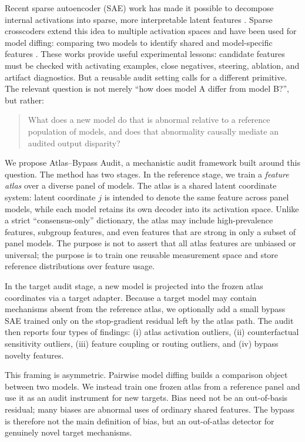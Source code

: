 \documentclass[11pt]{article}
\newcommand{\method}{Atlas--Bypass Audit\xspace}
\begin{document}
Recent sparse autoencoder (SAE) work has made it possible to decompose internal activations into sparse, more interpretable latent features \citep{bricken2023monosemanticity, gao2024scaling}. Sparse crosscoders extend this idea to multiple activation spaces and have been used for model diffing: comparing two models to identify shared and model-specific features \citep{lindsey2024crosscoders, lindsey2025crosscoderinsights, ren2026dfc}. These works provide useful experimental lessons: candidate features must be checked with activating examples, close negatives, steering, ablation, and artifact diagnostics. But a reusable audit setting calls for a different primitive. The relevant question is not merely ``how does model A differ from model B?'', but rather:

\begin{quote}
What does a new model do that is abnormal relative to a reference population of models, and does that abnormality causally mediate an audited output disparity?
\end{quote}

We propose \method, a mechanistic audit framework built around this question. The method has two stages. In the reference stage, we train a \emph{feature atlas} over a diverse panel of models. The atlas is a shared latent coordinate system: latent coordinate $j$ is intended to denote the same feature across panel models, while each model retains its own decoder into its activation space. Unlike a strict ``consensus-only'' dictionary, the atlas may include high-prevalence features, subgroup features, and even features that are strong in only a subset of panel models. The purpose is not to assert that all atlas features are unbiased or universal; the purpose is to train one reusable measurement space and store reference distributions over feature usage.

In the target audit stage, a new model is projected into the frozen atlas coordinates via a target adapter. Because a target model may contain mechanisms absent from the reference atlas, we optionally add a small bypass SAE trained only on the stop-gradient residual left by the atlas path. The audit then reports four types of findings: (i) atlas activation outliers, (ii) counterfactual sensitivity outliers, (iii) feature coupling or routing outliers, and (iv) bypass novelty features.

This framing is asymmetric. Pairwise model diffing builds a comparison object between two models. We instead train one frozen atlas from a reference panel and use it as an audit instrument for new targets. Bias need not be an out-of-basis residual; many biases are abnormal uses of ordinary shared features. The bypass is therefore not the main definition of bias, but an out-of-atlas detector for genuinely novel target mechanisms.
\end{document}
